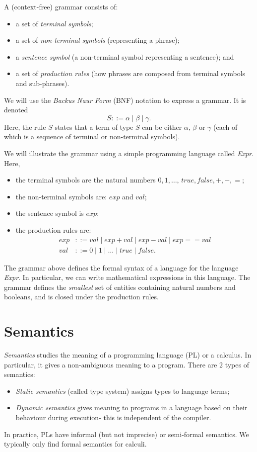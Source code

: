 \documentclass[a4paper, openany]{memoir}
\begin{document}
    A (context-free) grammar consists of:
    \begin{itemize}
        \item a set of \emph{terminal symbols};
        \item a set of \emph{non-terminal symbols} (representing a phrase);
        \item a \emph{sentence symbol} (a non-terminal symbol representing a sentence); and
        \item a set of \emph{production rules} (how phrases are composed from terminal symbols and sub-phrases).
    \end{itemize}

    We will use the \emph{Backus Naur Form} (BNF) notation to express a grammar. It is denoted
    \[S ::= \alpha \mid \beta \mid \gamma.\]
    Here, the rule $S$ states that a term of type $S$ can be either $\alpha$, $\beta$ or $\gamma$ (each of which is a sequence of terminal or non-terminal symbols).

    We will illustrate the grammar using a simple programming language called \textit{Expr}. Here,
    \begin{itemize}
        \item the terminal symbols are the natural numbers $0, 1, \dots$, $\textit{true}, \textit{false}, +, -, =$;
        \item the non-terminal symbols are: $exp$ and $val$;
        \item the sentence symbol is $exp$;
        \item the production rules are:
        \begin{align*}
            exp &::= val \mid exp + val \mid exp - val \mid exp == val \\
            val &::= 0 \mid 1 \mid \dots \mid \textit{true} \mid \textit{false}.
        \end{align*}
    \end{itemize}
    The grammar above defines the formal syntax of a language for the language \textit{Expr}. In particular, we can write mathematical expressions in this language. The grammar defines the \emph{smallest} set of entities containing natural numbers and booleans, and is closed under the production rules.
    \newpage

    \section{Semantics}
    \emph{Semantics} studies the meaning of a programming language (PL) or a calculus. In particular, it gives a non-ambiguous meaning to a program. There are 2 types of semantics:
    \begin{itemize}
        \item \emph{Static semantics} (called type system) assigns types to language terms;
        \item \emph{Dynamic semantics} gives meaning to programs in a language based on their behaviour during execution- this is independent of the compiler.
    \end{itemize}
    In practice, PLs have informal (but not imprecise) or semi-formal semantics. We typically only find formal semantics for calculi.
\end{document}
